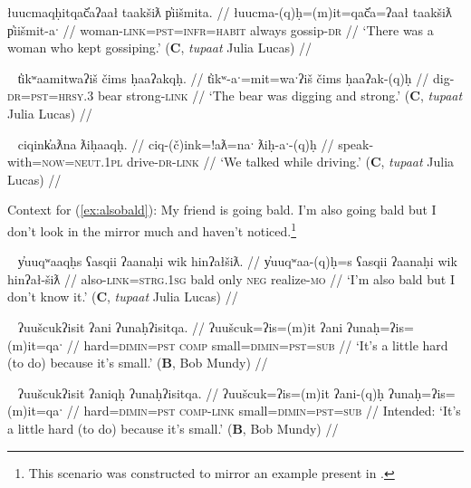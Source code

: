 \ex \label{ex:womangossiping}
\begingl
\glpreamble łuucmaqḥitqač̓aʔaał taakšiƛ p̓iišmita. //
\gla łuucma-(q)ḥ=(m)it=qač̓a=ʔaał taakšiƛ p̓iišmit-aˑ //
\glb woman-\textsc{link}=\textsc{pst}=\textsc{infr}=\textsc{habit} always gossip-\textsc{dr} //
\glft `There was a woman who kept gossiping.' (\textbf{C}, \textit{tupaat} Julia Lucas) //
\endgl
\xe

\ex~ \label{ex:strongbear}
\begingl
\glpreamble t̓ikʷaamitwaʔiš čims ḥaaʔakqḥ. //
\gla t̓ikʷ-aˑ=mit=waˑʔiš čims ḥaaʔak-(q)ḥ //
\glb dig-\textsc{dr}=\textsc{pst}=\textsc{hrsy.3} bear strong-\textsc{link} //
\glft `The bear was digging and strong.' (\textbf{C}, \textit{tupaat} Julia Lucas) //
\endgl
\xe

\ex~ \label{ex:talkdriving}
\begingl
\glpreamble ciqink̓aƛna ƛiḥaaqḥ. //
\gla ciq-(č)ink=!aƛ=naˑ ƛiḥ-aˑ-(q)ḥ //
\glb speak-with=\textsc{now}=\textsc{neut.1pl} drive-\textsc{dr}-\textsc{link} //
\glft `We talked while driving.' (\textbf{C}, \textit{tupaat} Julia Lucas) //
\endgl
\xe

\noindent Context for (\ref{ex:alsobald}): My friend is going bald. I'm also going bald but I don't look in the mirror much and haven't noticed.\footnote{This scenario was constructed to mirror an example present in \cite{sapir1939}.}

\vspace{5pt}

\ex~ \label{ex:alsobald}
\begingl
\glpreamble y̓uuqʷaaqḥs ʕasqii ʔaanaḥi wik hinʔałšiƛ. //
\gla y̓uuqʷaa-(q)ḥ=s ʕasqii ʔaanaḥi wik hinʔał-šiƛ //
\glb also-\textsc{link}=\textsc{strg.1sg} bald only \textsc{neg} realize-\textsc{mo} //
\glft `I'm also bald but I don't know it.' (\textbf{C}, \textit{tupaat} Julia Lucas) //
\endgl
\xe

\ex~ \label{ex:hardsmall1}
\begingl
\glpreamble ʔuušcukʔisit ʔani ʔunaḥʔisitqa. //
\gla ʔuušcuk=ʔis=(m)it ʔani ʔunaḥ=ʔis=(m)it=qaˑ //
\glb hard=\textsc{dimin}=\textsc{pst} \textsc{comp} small=\textsc{dimin}=\textsc{pst}=\textsc{sub} //
\glft `It's a little hard (to do) because it's small.' (\textbf{B}, Bob Mundy) //
\endgl
\xe

\ex~ \label{ex:hardsmall2}
\begingl
\glpreamble *ʔuušcukʔisit ʔaniqḥ ʔunaḥʔisitqa. //
\gla ʔuušcuk=ʔis=(m)it ʔani-(q)ḥ ʔunaḥ=ʔis=(m)it=qaˑ //
\glb hard=\textsc{dimin}=\textsc{pst} \textsc{comp}-\textsc{link} small=\textsc{dimin}=\textsc{pst}=\textsc{sub} //
\glft Intended: `It's a little hard (to do) because it's small.' (\textbf{B}, Bob Mundy) //
\endgl
\xe

